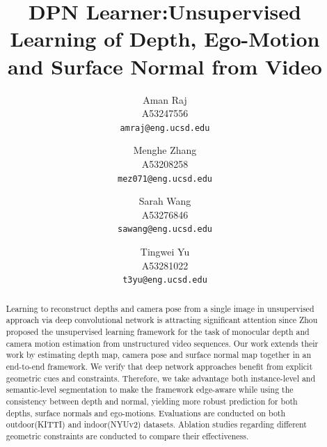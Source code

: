 \documentclass[10pt,twocolumn,letterpaper]{article}
\begin{document}
\title{DPN Learner:Unsupervised Learning of Depth, Ego-Motion and Surface Normal from Video}

\author{Aman Raj\\
A53247556\\
{\tt\small amraj@eng.ucsd.edu}
\and
Menghe Zhang\\
A53208258\\
{\tt\small mez071@eng.ucsd.edu}
\and
Sarah Wang\\
A53276846\\
{\tt\small sawang@eng.ucsd.edu}
\and
Tingwei Yu\\
A53281022\\
{\tt\small t3yu@eng.ucsd.edu}}

\maketitle

\begin{abstract}

Learning to reconstruct depths and camera pose from a single image in unsupervised approach via deep convolutional network is attracting significant attention since Zhou proposed the unsupervised learning framework for the task of monocular depth and camera motion estimation from unstructured video sequences\cite{zhou2017unsupervised}. Our work extends their work by estimating depth map, camera pose and surface normal map together in an end-to-end framework. We verify that deep network approaches benefit from explicit geometric cues and constraints. Therefore, we take advantage both instance-level and semantic-level segmentation to make the framework edge-aware while using the consistency between depth and normal, yielding more robust prediction for both depths, surface normals and ego-motions. Evaluations are conducted on both outdoor(KITTI) and indoor(NYUv2) datasets. Ablation studies regarding different geometric constraints are conducted to compare their effectiveness.  

\end{abstract}

\end{document}
